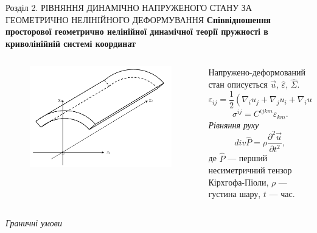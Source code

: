 \documentclass[handout, 8pt]{beamer}
\numberwithin{figure}{section}
\numberwithin{equation}{section}
\numberwithin{table}{section}
\begin{document}
\begin{frame}{Розділ 2. РІВНЯННЯ ДИНАМІЧНО НАПРУЖЕНОГО СТАНУ ЗА ГЕОМЕТРИЧНО НЕЛІНІЙНОГО ДЕФОРМУВАННЯ}
\textbf{Співвідношення просторової геометрично нелінійної динамічної теорії пружності в криволінійній системі координат}
\begin{columns}
	\begin{column}{0.32\linewidth}
		\begin{figure}
			\includegraphics[scale=0.15]{pic/layer.png}
			\caption{ }
			\label{fig:21}
		\end{figure}
	\end{column}
	\begin{column}{0.68\textwidth}
Напружено-деформований стан описується $\vec{u}$, $\hat{\varepsilon}$, $\hat{\Sigma}$.
\begin{equation}
\varepsilon_{ij} = \frac{1}{2} \left( \nabla_i u_j + \nabla_j u_i + \nabla_i u^j \nabla_j u_k \right),
\end{equation}
\begin{equation}
\sigma^{ij} = C^{ijkm}\varepsilon_{km}.
\end{equation}
\emph{Рівняння руху}
\begin{equation} \label{eq:P}
div \hat{P} = \rho \frac{\partial^2 \vec{u}}{\partial t^2},
\end{equation}
де $\hat{P}$ --- перший несиметричний тензор Кірхгофа-Піоли, $\rho$ --- густина шару, $t$ --- час.
	\end{column}
\end{columns}
\begin{columns}
    \column{\dimexpr\paperwidth-40pt}
\emph{Граничні умови}
\begin{align}

\end{align}
\end{columns}
\end{frame}
\end{document}
